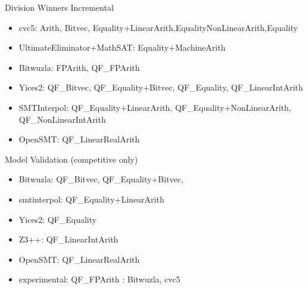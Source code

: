 \documentclass[table]{beamer}
\def\emph#1{\textcolor{MYblue}{#1}}
\begin{document}
\begin{frame}{Division Winners}
  \emph{Incremental}
  \begin{itemize}
\item \emph{cvc5}: Arith, Bitvec, Equality+LinearArith,EqualityNonLinearArith,Equality
\item \emph{UltimateEliminator+MathSAT}: Equality+MachineArith
\item \emph{Bitwuzla}: FPArith, QF\_FPArith
\item \emph{Yices2}: QF\_Bitvec, QF\_Equality+Bitvec, QF\_Equality, QF\_LinearIntArith
\item \emph{SMTInterpol}: QF\_Equality+LinearArith, QF\_Equality+NonLinearArith, QF\_NonLinearIntArith
\item \emph{OpenSMT}: QF\_LinearRealArith
  \end{itemize}
  \medskip

  \pause
  \emph{Model Validation (competitive only)}
  \begin{itemize}
\item \emph{Bitwuzla}: QF\_Bitvec, QF\_Equality+Bitvec,
\item \emph{smtinterpol}: QF\_Equality+LinearArith
\item \emph{Yices2}: QF\_Equality
\item \emph{Z3++}: QF\_LinearIntArith
\item \emph{OpenSMT}: QF\_LinearRealArith

\item experimental: QF\_FPArith : Bitwuzla, cvc5

  \end{itemize}
\end{frame}
\end{document}
